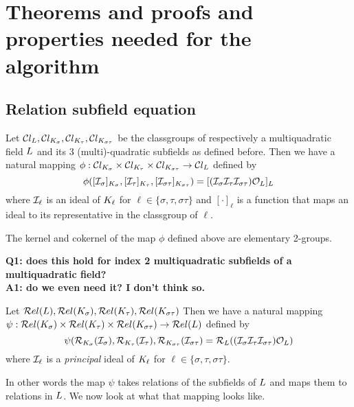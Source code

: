 \section{Theorems and proofs and properties needed for the algorithm}
\label{sec:props}

\subsection{Relation subfield equation}
Let $\mathcal{C}l_{L}, \mathcal{C}l_{K_{\sigma}}, \mathcal{C}l_{K_{\tau}}, \mathcal{C}l_{K_{\sigma\tau}}$
be the classgroups of respectively a multiquadratic field $L$ and its $3$
(multi)-quadratic subfields as defined before.
Then we have a natural mapping $\phi: \mathcal{C}l_{K_{\sigma}}\times \mathcal{C}l_{K_{\tau}}\times \mathcal{C}l_{K_{\sigma\tau}} \rightarrow \mathcal{C}l_{L}$
defined by
$$
\phi([\mathcal{I}_{\sigma}]_{K_{\sigma}},[\mathcal{I}_{\tau}]_{K_{\tau}},[\mathcal{I}_{\sigma\tau}]_{K_{\sigma\tau}}) = [(\mathcal{I}_{\sigma} \mathcal{I}_{\tau} \mathcal{I}_{\sigma\tau})\mathcal{O}_L]_L
$$
where $\mathcal{I}_{\ell}$ is an ideal of $K_{\ell}$ for $\ell \in \{\sigma, \tau, \sigma\tau\}$ and $[\cdot]_\ell$ is a 
function that maps an ideal to its representative in the classgroup of $\ell$.

\begin{mylma}
The kernel and cokernel of the map $\phi$ defined above are elementary 2-groups.
\end{mylma}

\noindent
{\bf Q1: does this hold for index 2 multiquadratic subfields of a multiquadratic field?\\
A1: do we even need it? I don't think so.}

\begin{mydef}
Let $\mathcal{R}el(L), \mathcal{R}el(K_{\sigma}), \mathcal{R}el(K_{\tau}), \mathcal{R}el(K_{\sigma\tau})$
Then we have a natural mapping $\psi: \mathcal{R}el(K_{\sigma})\times \mathcal{R}el(K_{\tau})\times \mathcal{R}el(K_{\sigma\tau}) \rightarrow \mathcal{R}el(L)$
defined by
$$
\psi(\mathcal{R}_{K_{\sigma}}(\mathcal{I}_{\sigma}), \mathcal{R}_{K_{\tau}}(\mathcal{I}_{\tau}),\mathcal{R}_{K_{\sigma\tau}}(\mathcal{I}_{\sigma\tau}) 
= \mathcal{R}_{L}((\mathcal{I}_{\sigma} \mathcal{I}_{\tau} \mathcal{I}_{\sigma\tau})\mathcal{O}_L)
$$
where $\mathcal{I}_{\ell}$ is a \textit{principal} ideal of $K_{\ell}$ for $\ell \in \{\sigma, \tau, \sigma\tau\}$.
\end{mydef}

In other words the map $\psi$ takes relations of the subfields of $L$ and 
maps them to relations in $L$.
We now look at what that mapping looks like.

